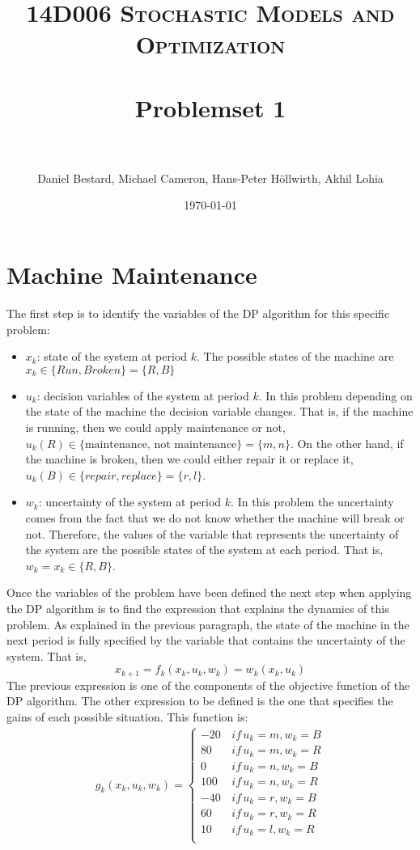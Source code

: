 \documentclass[11pt, oneside]{article}   	%
\title{	
\normalfont \normalsize 
\textsc{14D006 Stochastic Models and Optimization} \\ [25pt] %
\horrule{0.5pt} \\[0.4cm] %
\huge Problemset 1\\ %
\horrule{2pt} \\[0.5cm] %
}
\author{Daniel Bestard, Michael Cameron, Hans-Peter H{\"o}llwirth, Akhil Lohia} %
\date{\normalsize\today} %
\begin{document}
\maketitle


\section{Machine Maintenance}
The first step is to identify the variables of the DP algorithm for this specific problem:
\begin{itemize}
	\item $x_{k}$: state of the system at period $k$. The possible states of the machine are $x_{k} \in \{Run, Broken\} = \{R,B\}$
	\item $u_{k}$: decision variables of the system at period $k$. In this problem depending on the state of the machine the decision variable changes. That is, if the machine is running, then we could apply maintenance or not, $u_{k}(R) \in \{\text{maintenance, not maintenance}\} = \{m,n\}$. On the other hand, if the machine is broken, then we could either repair it or replace it, $u_{k}(B) \in \{repair, replace\} = \{r,l\}$.
	\item $w_{k}$: uncertainty of the system at period $k$. In this problem the uncertainty comes from the fact that we do not know whether the machine will break or not. Therefore, the values of the variable that represents the uncertainty of the system are the possible states of the system at each period. That is, $w_{k} = x_{k} \in \{R,B\}$.
\end{itemize}
Once the variables of the problem have been defined the next step when applying the DP algorithm is to find the expression that explains the dynamics of this problem. As explained in the previous paragraph, the state of the machine in the next period is fully specified by the variable that contains the uncertainty of the system. That is,
$$x_{k+1} = f_{k}(x_{k},u_{k},w_{k}) = w_{k}(x_{k},u_{k})$$
The previous expression is one of the components of the objective function of the DP algorithm. The other expression to be defined is the one that specifies the gains of each possible situation. This function is:
\begin{align*}
g_{k}(x_{k},u_{k},w_{k}) =
\begin{cases}
	-20  \, & if \, u_{k}=m,w_{k}=B\\
	 80  \, & if \, u_{k}=m,w_{k}=R\\
	 0  \, & if \, u_{k}=n,w_{k}=B\\
	 100  \, & if \, u_{k}=n,w_{k}=R\\
	 -40  \, & if \, u_{k}=r,w_{k}=B\\
	 60  \, & if \, u_{k}=r,w_{k}=R\\
	 10  \, & if \, u_{k}=l,w_{k}=R\\
\end{cases}
\end{align*}
\end{document}
